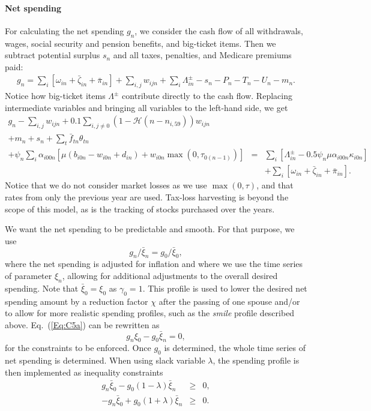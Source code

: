\documentclass{report}[fleqn,12pt]
\begin{document}
\paragraph*{Net spending}
	For calculating the net spending $g_n$, we consider the cash flow of all withdrawals,
	wages, social security and pension benefits, and big-ticket items. 
	Then we subtract potential surplus $s_{n}$ and all taxes, penalties, and Medicare premiums paid:
	\begin{eqnarray}
		g_n = \sum_i [\omega_{in} + \bar{\zeta}_{in} + \bar{\pi}_{in} ] 
		+ \sum_{i,j} w_{ijn} + \sum_i \Lambda^\pm_{in} - s_{n}
		- P_n - T_n - U_n - m_n.
	\end{eqnarray}
	Notice how big-ticket items $\Lambda^\pm$ contribute directly to the cash flow.
	Replacing intermediate variables and bringing all variables to the left-hand side, we get
	\begin{eqnarray}
		\label{Eq:C4}
		g_n - \sum_{i,j} w_{ijn} + 0.1 \sum_{i,j\neq0} (1-\mathcal{H}(n - n_{i, 59})) w_{ijn}\nonumber\\
                + m_n + s_n + \sum_t \bar{f}_{tn} \theta_{t n} &&\nonumber \\
		+ \psi_n\sum_i \alpha_{i00n} \left[\mu(b_{i0n} - w_{i0n} + d_{in})
		+ w_{i0n}\max(0, \tau_{0(n-1)})\right] 
		&=& \sum_i [\Lambda^\pm_{in} - 0.5\psi_n\mu\alpha_{i00n}\kappa_{i0n}] \nonumber\\
                && + \sum_i [\omega_{in} + \bar{\zeta}_{in} + \bar{\pi}_{in} ].
	\end{eqnarray}
	Notice that we do not consider market losses as we use $\max(0, \tau)$, and that
	rates from only the previous year are used. Tax-loss
	harvesting is beyond the scope of this model, as is the tracking of stocks
	purchased over the years.

	We want the net spending to be predictable and smooth. For that purpose, we use
\begin{equation}
	\label{Eq:C5a}
	g_{n}/\bar{\xi}_{n} = g_0/\bar{\xi}_0,
\end{equation}
where the net spending is adjusted for inflation and where we use the time series of parameter $\xi_n$,
allowing for additional adjustments to the overall desired spending.
Note that $\bar{\xi}_0 = \xi_0$ as $\gamma_0=1$.
This profile is used to lower the desired net spending amount by a reduction factor $\chi$
after the passing of one spouse and/or to allow for more realistic spending profiles, such as
the {\em smile} profile described above.
Eq.~(\ref{Eq:C5a}) can be rewritten as
\begin{equation}
	\label{Eq:C5}
	g_n \xi_0 - g_0 \bar{\xi}_n = 0,
\end{equation}
for the constraints to be enforced. Once $g_0$ is determined, the whole time series of net spending
is determined.
When using slack variable $\lambda$, the spending profile is then implemented as inequality constraints
\begin{eqnarray}
	\label{Eq:lambdha}
	g_n \bar{\xi}_0 - g_0 (1 - \lambda) \bar{\xi}_n &\geq&  0, \nonumber\\
	-g_n \bar{\xi}_0 + g_0 (1 + \lambda) \bar{\xi}_n &\geq&  0.
\end{eqnarray}
\end{document}
